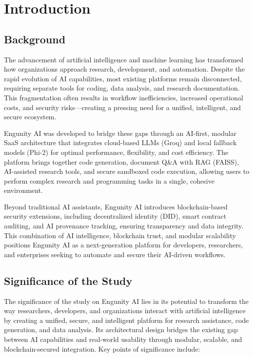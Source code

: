 \chapter{Introduction}
\section{Background}
The advancement of artificial intelligence and machine learning has transformed how organizations approach research, development, and automation. Despite the rapid evolution of AI capabilities, most existing platforms remain disconnected, requiring separate tools for coding, data analysis, and research documentation. This fragmentation often results in workflow inefficiencies, increased operational costs, and security risks—creating a pressing need for a unified, intelligent, and secure ecosystem.

Engunity AI was developed to bridge these gaps through an AI-first, modular SaaS architecture that integrates cloud-based LLMs (Groq) and local fallback models (Phi-2) for optimal performance, flexibility, and cost efficiency. The platform brings together code generation, document Q&A with RAG (FAISS), AI-assisted research tools, and secure sandboxed code execution, allowing users to perform complex research and programming tasks in a single, cohesive environment.

Beyond traditional AI assistants, Engunity AI introduces blockchain-based security extensions, including decentralized identity (DID), smart contract auditing, and AI provenance tracking, ensuring transparency and data integrity. This combination of AI intelligence, blockchain trust, and modular scalability positions Engunity AI as a next-generation platform for developers, researchers, and enterprises seeking to automate and secure their AI-driven workflows.\cite{brown2020gpt3}

\pagebreak



\section{Significance of the Study}
The significance of the study on Engunity AI lies in its potential to transform the way researchers, developers, and organizations interact with artificial intelligence by creating a unified, secure, and intelligent platform for research assistance, code generation, and data analysis. Its architectural design bridges the existing gap between AI capabilities and real-world usability through modular, scalable, and blockchain-secured integration. Key points of significance include:

